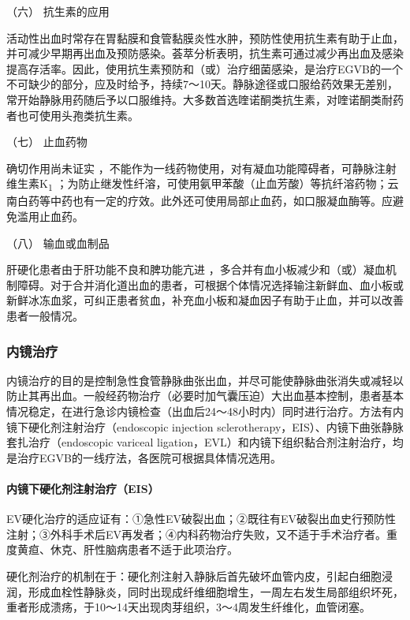 \hypertarget{text00328.htmlux5cux23CHP11-7-1-3-2-6}{}
（六） 抗生素的应用

活动性出血时常存在胃黏膜和食管黏膜炎性水肿，预防性使用抗生素有助于止血，并可减少早期再出血及预防感染。荟萃分析表明，抗生素可通过减少再出血及感染提高存活率。因此，使用抗生素预防和（或）治疗细菌感染，是治疗EGVB的一个不可缺少的部分，应及时给予，持续7～10天。静脉途径或口服给药效果无差别，常开始静脉用药随后予以口服维持。大多数首选喹诺酮类抗生素，对喹诺酮类耐药者也可使用头孢类抗生素。

\hypertarget{text00328.htmlux5cux23CHP11-7-1-3-2-7}{}
（七） 止血药物

确切作用尚未证实
，不能作为一线药物使用，对有凝血功能障碍者，可静脉注射维生素K\textsubscript{1}
；为防止继发性纤溶，可使用氨甲苯酸（止血芳酸）等抗纤溶药物；云南白药等中药也有一定的疗效。此外还可使用局部止血药，如口服凝血酶等。应避免滥用止血药。

\hypertarget{text00328.htmlux5cux23CHP11-7-1-3-2-8}{}
（八） 输血或血制品

肝硬化患者由于肝功能不良和脾功能亢进
，多合并有血小板减少和（或）凝血机制障碍。对于合并消化道出血的患者，可根据个体情况选择输注新鲜血、血小板或新鲜冰冻血浆，可纠正患者贫血，补充血小板和凝血因子有助于止血，并可以改善患者一般情况。

\subsubsection{内镜治疗}

内镜治疗的目的是控制急性食管静脉曲张出血，并尽可能使静脉曲张消失或减轻以防止其再出血。一般经药物治疗（必要时加气囊压迫）大出血基本控制，患者基本情况稳定，在进行急诊内镜检查（出血后24～48小时内）同时进行治疗。方法有内镜下硬化剂注射治疗（endoscopic
injection sclerotherapy，EIS）、内镜下曲张静脉套扎治疗（endoscopic
variceal
ligation，EVL）和内镜下组织黏合剂注射治疗，均是治疗EGVB的一线疗法，各医院可根据具体情况选用。

\paragraph{内镜下硬化剂注射治疗（EIS）}

EV硬化治疗的适应证有：①急性EV破裂出血；②既往有EV破裂出血史行预防性注射；③外科手术后EV再发者；④内科药物治疗失败，又不适于手术治疗者。重度黄疸、休克、肝性脑病患者不适于此项治疗。

硬化剂治疗的机制在于：硬化剂注射入静脉后首先破坏血管内皮，引起白细胞浸润，形成血栓性静脉炎，同时出现成纤维细胞增生，一周左右发生局部组织坏死，重者形成溃疡，于10～14天出现肉芽组织，3～4周发生纤维化，血管闭塞。

